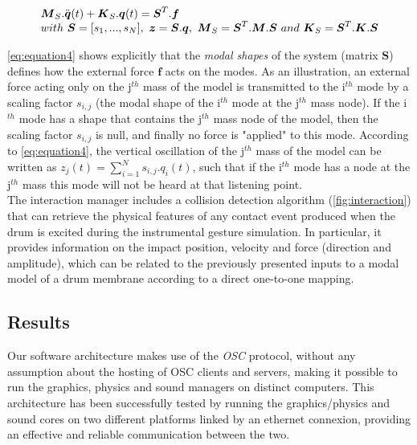 \begin{equation}
	\begin{array}{l}
		\boldsymbol{M}_S . \ddot{\boldsymbol{q}}(t) + \boldsymbol{K}_S . \boldsymbol{q}(t) = \boldsymbol{S}^T . \boldsymbol{f} \\
		with\ \boldsymbol{S} = [s_1, ..., s_N],\ \boldsymbol{z} = \boldsymbol{S} . \boldsymbol{q},\ \boldsymbol{M}_S = \boldsymbol{S}^T . \boldsymbol{M} . \boldsymbol{S}\ and\ \boldsymbol{K}_S = \boldsymbol{S}^T . \boldsymbol{K} . \boldsymbol{S}
	\end{array}
\label{eq:equation4}
\eqcaption{Modal synthesis formulation under the influence of an external force: normal formulation}
\end{equation}

\myequname \eqref{eq:equation4} shows explicitly that the \emph{modal shapes} of the system (matrix $\boldsymbol{S}$) defines how the external force $\boldsymbol{f}$ acts on the modes. As an illustration, an external force acting only on the j$^{th}$ mass of the model is transmitted to the i$^{th}$ mode by a scaling factor $s_{i, j}$ (the modal shape of the i$^{th}$ mode at the j$^{th}$ mass node). If the i$^{th}$ mode has a shape that contains the j$^{th}$ mass node of the model, then the scaling factor $s_{i, j}$ is null, and finally no force is "applied" to this mode. According to \myequname \eqref{eq:equation4}, the vertical oscillation of the j$^{th}$ mass of the model can be written as $z_j(t) = \sum_{i = 1}^{N} s_{i, j} . q_i(t)$, such that if the i$^{th}$ mode has a node at the j$^{th}$ mass this mode will not be heard at that listening point.\\

The interaction manager includes a collision detection algorithm (\myfigname \ref{fig:interaction}) that can retrieve the physical features of any contact event produced when the drum is excited during the instrumental gesture simulation. In particular, it provides information on the impact position, velocity and force (direction and amplitude), which can be related to the previously presented inputs to a modal model of a drum membrane according to a direct one-to-one mapping.


		\subsection{Results}
		\label{subsec:Synthesis_Control_Results}

Our software architecture makes use of the \emph{OSC} protocol, without any assumption about the hosting of OSC clients and servers, making it possible to run the graphics, physics and sound managers on distinct computers. This architecture has been successfully tested by running the graphics/physics and sound cores on two different platforms linked by an ethernet connexion, providing an effective and reliable communication between the two.

